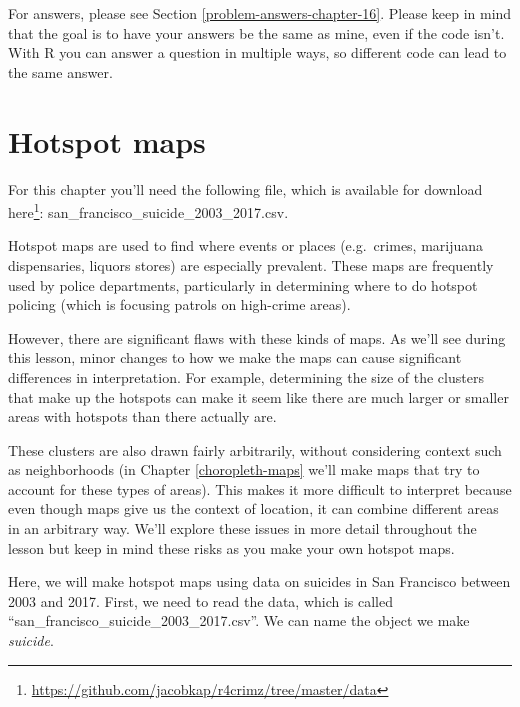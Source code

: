 \documentclass[
]{krantz}
\renewcommand{\href}[2]{#2\footnote{\url{#1}}}
\begin{document}
For answers, please see Section \ref{problem-answers-chapter-16}. Please keep in mind that the goal is to have your answers be the same as mine, even if the code isn't. With R you can answer a question in multiple ways, so different code can lead to the same answer.

\hypertarget{hotspot-maps}{%
\chapter{Hotspot maps}\label{hotspot-maps}}

For this chapter you'll need the following file, which is available for download \href{https://github.com/jacobkap/r4crimz/tree/master/data}{here}: san\_francisco\_suicide\_2003\_2017.csv.

Hotspot maps are used to find where events or places (e.g.~crimes, marijuana dispensaries, liquors stores) are especially prevalent. These maps are frequently used by police departments, particularly in determining where to do hotspot policing (which is focusing patrols on high-crime areas).

However, there are significant flaws with these kinds of maps. As we'll see during this lesson, minor changes to how we make the maps can cause significant differences in interpretation. For example, determining the size of the clusters that make up the hotspots can make it seem like there are much larger or smaller areas with hotspots than there actually are.

These clusters are also drawn fairly arbitrarily, without considering context such as neighborhoods (in Chapter \ref{choropleth-maps} we'll make maps that try to account for these types of areas). This makes it more difficult to interpret because even though maps give us the context of location, it can combine different areas in an arbitrary way. We'll explore these issues in more detail throughout the lesson but keep in mind these risks as you make your own hotspot maps.

Here, we will make hotspot maps using data on suicides in San Francisco between 2003 and 2017. First, we need to read the data, which is called ``san\_francisco\_suicide\_2003\_2017.csv''. We can name the object we make \emph{suicide}.
\end{document}
